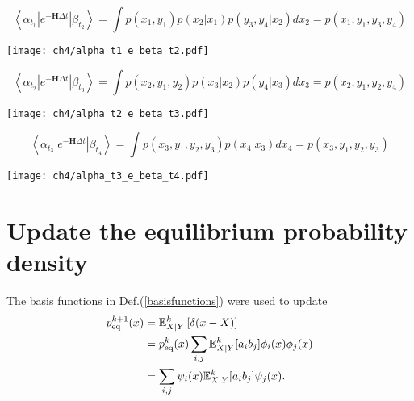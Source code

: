 \begin{definition}
\begin{equation}
    \left< \alpha_{t_1} | e^{-\textbf{H}\Delta t} | \beta_{t_2} \right> = \int p(x_1,y_1) p(x_2|x_1) p(y_3,y_4|x_2) dx_2= p(x_1,y_1,y_3,y_4)
\end{equation}
\begin{center}
    \texttt{[image: ch4/alpha\_t1\_e\_beta\_t2.pdf]}   
\end{center}
\end{definition}

\begin{definition}
\begin{equation}
    \left< \alpha_{t_2} | e^{-\textbf{H}\Delta t} | \beta_{t_3} \right> = \int p(x_2,y_1,y_2) p(x_3|x_2) p(y_4|x_3) dx_3= p(x_2,y_1,y_2,y_4)
\end{equation}
\begin{center}
    \texttt{[image: ch4/alpha\_t2\_e\_beta\_t3.pdf]}   
\end{center}
\end{definition}

\begin{definition}
\begin{equation}
    \left< \alpha_{t_3} | e^{-\textbf{H}\Delta t} | \beta_{t_4} \right> = \int p(x_3,y_1,y_2,y_3) p(x_4|x_3) dx_4= p(x_3,y_1,y_2,y_3)
\end{equation}
\begin{center}
    \texttt{[image: ch4/alpha\_t3\_e\_beta\_t4.pdf]}   
\end{center}
\end{definition}

\section{Update the equilibrium probability density}
\begin{definition}
    The basis functions in Def.(\ref{basisfunctions}) were used to update
\begin{align}
    p_{\rm eq}^{k+1}(x) &=\mathbb{E}^k_{X|Y} \left[ \delta(x-X) \right] \\
    &= p^k_{\rm{eq}}(x) \sum_{i,j} \mathbb{E}^k_{X|Y}[a_ib_j] \phi_i(x)\phi_j(x) \\
    &= \sum_{i,j} \psi_i(x) \mathbb{E}^k_{X|Y}[a_ib_j] \psi_j(x).
\end{align}
\end{definition}

